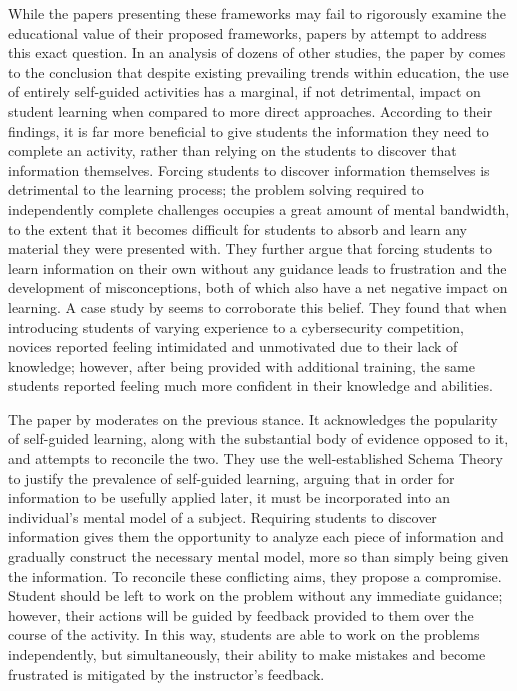     While the papers presenting these frameworks may fail to rigorously examine the educational value of their proposed frameworks, papers by \textcite{J-Sweller,R-Weiss} attempt to address this exact question. %
In an analysis of dozens of other studies, the paper by \citeauthor{J-Sweller} comes to the conclusion that despite existing prevailing trends within education, the use of entirely self-guided activities has a marginal, if not detrimental, impact on student learning when compared to more direct approaches. %
According to their findings, it is far more beneficial to give students the information they need to complete an activity, rather than relying on the students to discover that information themselves. %
Forcing students to discover information themselves is detrimental to the learning process; %
the problem solving required to independently complete challenges occupies a great amount of mental bandwidth, to the extent that it becomes difficult for students to absorb and learn any material they were  presented with. %
They further argue that forcing students to learn information on their own without any guidance leads to frustration and the development of misconceptions, both of which also have a net negative impact on learning. %
A case study by \textcite{L-Thomas} seems to corroborate this belief. %
They found that when introducing students of varying experience to a cybersecurity competition, novices reported feeling intimidated and unmotivated due to their lack of knowledge; %
however, after being provided with additional training, the same students reported feeling much more confident in their knowledge and abilities. 

    The paper by \textcite{R-Weiss} moderates on the previous stance. %
It acknowledges the popularity of self-guided learning, along with the substantial body of evidence opposed to it, and attempts to reconcile the two. %
They use the well-established Schema Theory to justify the prevalence of self-guided learning, arguing that in order for information to be usefully applied later, it must be incorporated into an individual's mental model of a subject. %
Requiring students to discover information gives them the opportunity to analyze each piece of information and gradually construct the necessary mental model, more so than simply being given the information. %
To reconcile these conflicting aims, they propose a compromise. %
Student should be left to work on the problem without any immediate guidance; %
however, their actions will be guided by feedback provided to them over the course of the activity. %
In this way, students are able to work on the problems independently, but simultaneously, their ability to make mistakes and become frustrated is mitigated by the instructor's feedback. 

